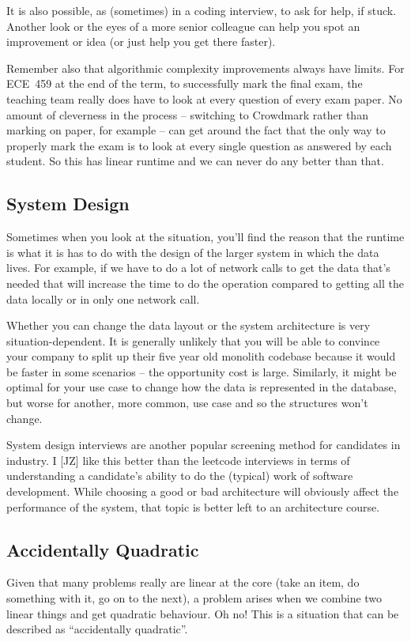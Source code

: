 It is also possible, as (sometimes) in a coding interview, to ask for help, if stuck. Another look or the eyes of a more senior colleague can help you spot an improvement or idea (or just help you get there faster). 

Remember also that algorithmic complexity improvements always have limits. For ECE~459 at the end of the term, to successfully mark the final exam, the teaching team really does have to look at every question of every exam paper. No amount of cleverness in the process -- switching to Crowdmark rather than marking on paper, for example -- can get around the fact that the only way to properly mark the exam is to look at every single question as answered by each student. So this has linear runtime and we can never do any better than that. 

\subsection*{System Design}
Sometimes when you look at the situation, you'll find the reason that the runtime is what it is has to do with the design of the larger system in which the data lives. For example, if we have to do a lot of network calls to get the data that's needed that will increase the time to do the operation compared to getting all the data locally or in only one network call. 

Whether you can change the data layout or the system architecture is very situation-dependent. It is generally unlikely that you will be able to convince your company to split up their five year old monolith codebase because it would be faster in some scenarios -- the opportunity cost is large. Similarly, it might be optimal for your use case to change how the data is represented in the database, but worse for another, more common, use case and so the structures won't change. 

System design interviews are another popular screening method for candidates in industry. I [JZ] like this better than the leetcode interviews in terms of understanding a candidate's ability to do the (typical) work of software development. While choosing a good or bad architecture will obviously affect the performance of the system, that topic is better left to an architecture course.

\subsection*{Accidentally Quadratic}
Given that many problems really are linear at the core (take an item, do something with it, go on to the next), a problem arises when we combine two linear things and get quadratic behaviour. Oh no! This is a situation that can be described as ``accidentally quadratic''.

